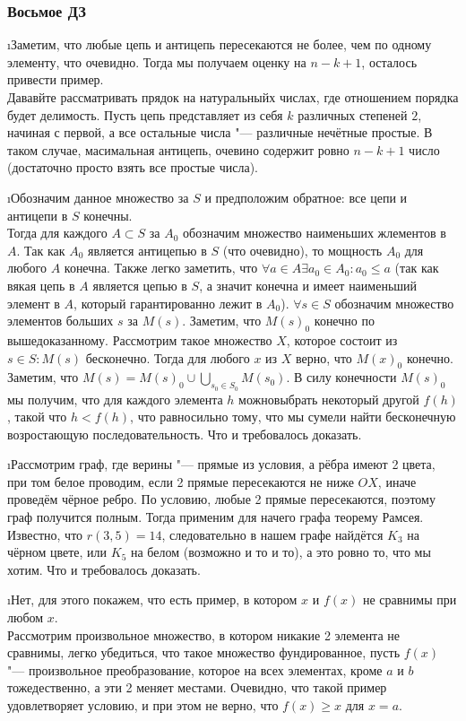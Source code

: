 \subsubsection{Восьмое ДЗ}


\i Заметим, что любые цепь и антицепь пересекаются не более, чем по одному элементу, что очевидно. Тогда мы получаем оценку на $n-k+1$, осталось привести пример.\\
Дававйте рассматривать прядок на натуральныйх числах, где отношением порядка будет делимость. Пусть цепь представляет из себя $k$ различных степеней $2$, начиная с первой, а все остальные числа "--- различные нечётные простые. В таком случае, масимальная антицепь, очевино содержит ровно $n-k+1$ число (достаточно просто взять все простые числа).

\i Обозначим данное множество за $S$ и предположим обратное: все цепи и антицепи в $S$ конечны.\\
Тогда для каждого $A \subset S$ за $A_0$ обозначим множество наименьших жлементов в $A$. Так как $A_0$ является антицепью в $S$ (что очевидно), то мощность $A_0$ для любого $A$ конечна. Также легко заметить, что $\forall a \in A \exists a_0 \in A_0: a_0 \leq a$ (так как вякая цепь в $A$ является цепью в $S$, а значит конечна и имеет наименьший элемент в $A$, который гарантированно лежит в $A_0$).
$\forall s \in S$ обозначим множество элементов больших $s$ за $M(s)$. Заметим, что $M(s)_0$ конечно по вышедоказанному. Рассмотрим такое множество $X$, которое состоит из $s \in S: M(s)$ бесконечно. Тогда для любого $x$ из $X$ верно, что $M(x)_0$ конечно.\\
Заметим, что $M(s) = M(s)_0 \cup \bigcup\limits_{s_0 \in S_0} M(s_0)$. В силу конечности $M(s)_0$ мы получим, что для каждого элемента $h$ можновыбрать некоторый другой $f(h)$, такой что $h < f(h)$, что равносильно тому, что мы сумели найти бесконечную возростающую последовательность. Что и требовалось доказать.

\i Рассмотрим граф, где верины "--- прямые из условия, а рёбра имеют 2 цвета, при том белое проводим, если 2 прямые пересекаются не ниже $OX$, иначе проведём чёрное ребро. По условию, любые 2 прямые пересекаются, поэтому граф получится полным. Тогда применим для начего графа теорему Рамсея. Известно, что $r(3, 5) = 14$, следовательно в нашем графе найдётся $K_3$ на чёрном цвете, или $K_5$ на белом (возможно и то и то), а это ровно то, что мы хотим. Что и требовалось доказать.

\i Нет, для этого покажем, что есть пример, в котором $x$ и $f(x)$ не сравнимы при любом $x$.\\
Рассмотрим произвольное множество, в котором никакие 2 элемента не сравнимы, легко убедиться, что такое множество фундированное, пусть $f(x)$ "--- произвольное преобразование, которое на всех элементах, кроме $a$ и $b$ тожедественно, а эти 2 меняет местами. Очевидно, что такой пример удовлетворяет условию, и при этом не верно, что $f(x) \geq x$ для $x = a$.

